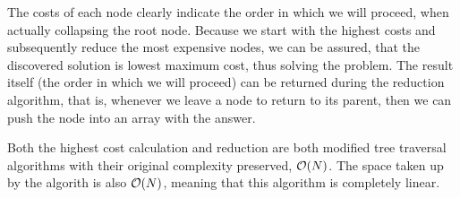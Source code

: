 \documentclass{../../../ksp}
\begin{document}
The costs of each node clearly indicate the order in which we will proceed, when actually collapsing the root node.
Because we start with the highest costs and subsequently reduce the most expensive nodes, we can be assured, that the discovered solution is lowest maximum cost, thus solving the problem.
The result itself (the order in which we will proceed) can be returned during the reduction algorithm, that is, whenever we leave a node to return to its parent, then we can push the node into an array with the answer.

Both the highest cost calculation and reduction are both modified tree traversal algorithms with their original complexity preserved, $\mathcal{O}(N)$.
The space taken up by the algorith is also $\mathcal{O}(N)$, meaning that this algorithm is completely linear.
\end{document}
